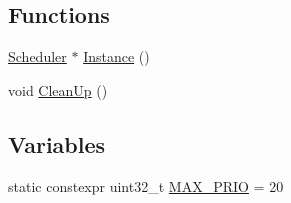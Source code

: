 \subsection*{Functions}
\begin{DoxyCompactItemize}
\item 
\hyperlink{classapollo_1_1cyber_1_1scheduler_1_1Scheduler}{Scheduler} $\ast$ \hyperlink{namespaceapollo_1_1cyber_1_1scheduler_aa3840df1c2d2c2b4593d229da1c1d0df}{Instance} ()
\item 
void \hyperlink{namespaceapollo_1_1cyber_1_1scheduler_afccf62ddcce3f9a2326d126309ee7fc7}{Clean\-Up} ()
\end{DoxyCompactItemize}
\subsection*{Variables}
\begin{DoxyCompactItemize}
\item 
static constexpr uint32\-\_\-t \hyperlink{namespaceapollo_1_1cyber_1_1scheduler_a9bc4ff591ee6d0710ed99d197b4ce9d2}{M\-A\-X\-\_\-\-P\-R\-I\-O} = 20
\end{DoxyCompactItemize}


